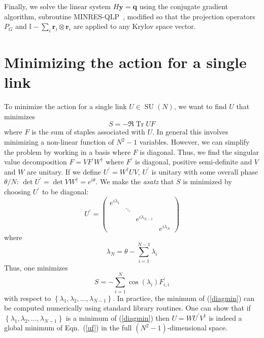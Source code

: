 \documentclass[preprint,aps,prd]{revtex4-2}
\newcommand{\be}{\begin{equation}}
\newcommand{\eq}{\end{equation}}
\DeclareMathOperator{\SU}{SU}
\DeclareMathOperator{\Tr}{Tr}
\begin{document}
Finally, we solve the linear system $H \mathbf{y} = \mathbf{q}$
using the conjugate gradient algorithm,
subroutine MINRES-QLP~\cite{choi_algorithm_2014}, modified so that
the projection operators $P_G$ and 
$\mathbb{I}- \sum_{i} \mathbf{r}_i \otimes \mathbf{r}_i$
are applied to any Krylov space vector.

\section{Minimizing the action for a single link}

\label{linkmin}
To minimize the action for a single link $U\in\SU(N)$,
we want to find $U$ that minimizes
%
\be
S = -\Re\Tr U F \label{uf}
\eq
where $F$ is the sum of staples associated with $U$.
In general this involves minimizing a non-linear function of $N^2-1$
variables.  However, we can simplify the problem by working
in a basis where $F$ is diagonal.  Thus, we find the singular
value decomposition $F = V F^\prime W^\dag$ where $F^\prime$ is diagonal,
positive semi-definite and $V$ and $W$ are unitary.
If we define $U^\prime=W^\dag U V$, $U^\prime$ is unitary with some overall
phase $\theta/N$: $\det U^\prime = \det V W^\dag = e^{i \theta}$.
We make the {\em asatz} that $S$ is minimized by choosing $U^\prime$
to be diagonal:
\be
U^\prime = \begin{pmatrix}
  e^{i \lambda_1} & & & \\
  & \ddots & & \\
  & & e^{i \lambda_{N-1}} & \\
  & & & e^{i \lambda_N} \end{pmatrix}
\eq
where
\be
\lambda_N = \theta - \sum_{i=1}^{N-1} \lambda_i
\eq
Thus, one minimizes
\be
S = %
    -\sum_{i=1}^N \cos\left(\lambda_i\right) F_{i,i}^\prime \label{diagmin}
\eq
with respect to $\left\{\lambda_1, \lambda_2, \ldots, \lambda_{N-1}\right\}$.
In practice, the minimum of (\ref{diagmin}) can be computed numerically
using standard library routines.
One can show that if $\left\{\lambda_1, \lambda_2, \ldots, \lambda_{N-1}\right\}$ is a minimum of
(\ref{diagmin}) then $U = W U^\prime V^\dag$ is indeed a global minimum
of Eqn.~(\ref{uf}) in the full $(N^2-1)$-dimensional space.

\end{document}
